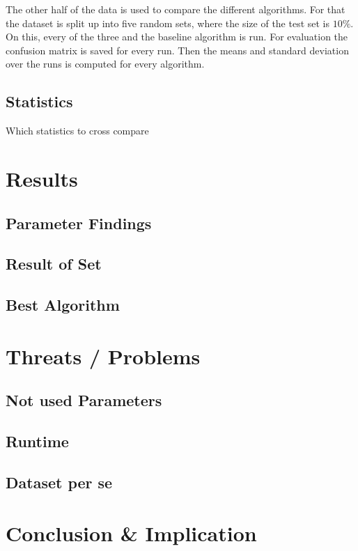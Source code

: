 \documentclass[a4paper,11pt]{article}
\begin{document}
The other half of the data is used to compare the different algorithms. For that the dataset is split up into five random sets, where the size of the test set is $10\%$. On this, every of the three and the baseline algorithm is run. For evaluation the confusion matrix is saved for every run. Then the means and standard deviation over the runs is computed for every algorithm.


\subsection{Statistics}


Which statistics to cross compare

\section{Results}

\subsection{Parameter Findings}

\subsection{Result of Set}

\subsection{Best Algorithm}

\section{Threats / Problems}

\subsection{Not used Parameters}
\subsection{Runtime}
\subsection{Dataset per se}

\section{Conclusion \& Implication}	




\end{document}

